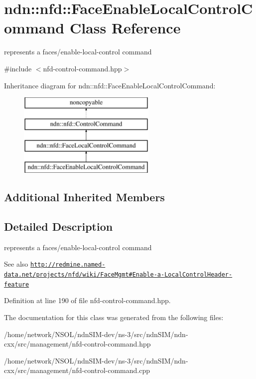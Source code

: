 \hypertarget{classndn_1_1nfd_1_1FaceEnableLocalControlCommand}{}\section{ndn\+:\+:nfd\+:\+:Face\+Enable\+Local\+Control\+Command Class Reference}
\label{classndn_1_1nfd_1_1FaceEnableLocalControlCommand}


represents a faces/enable-\/local-\/control command  




{\ttfamily \#include $<$nfd-\/control-\/command.\+hpp$>$}

Inheritance diagram for ndn\+:\+:nfd\+:\+:Face\+Enable\+Local\+Control\+Command\+:\begin{figure}[H]
\begin{center}
\leavevmode
\includegraphics[height=4.000000cm]{classndn_1_1nfd_1_1FaceEnableLocalControlCommand}
\end{center}
\end{figure}
\subsection*{Additional Inherited Members}


\subsection{Detailed Description}
represents a faces/enable-\/local-\/control command 

\begin{DoxySeeAlso}{See also}
\href{http://redmine.named-data.net/projects/nfd/wiki/FaceMgmt#Enable-a-LocalControlHeader-feature}{\tt http\+://redmine.\+named-\/data.\+net/projects/nfd/wiki/\+Face\+Mgmt\#\+Enable-\/a-\/\+Local\+Control\+Header-\/feature} 
\end{DoxySeeAlso}


Definition at line 190 of file nfd-\/control-\/command.\+hpp.



The documentation for this class was generated from the following files\+:\begin{DoxyCompactItemize}
\item 
/home/network/\+N\+S\+O\+L/ndn\+S\+I\+M-\/dev/ns-\/3/src/ndn\+S\+I\+M/ndn-\/cxx/src/management/nfd-\/control-\/command.\+hpp\item 
/home/network/\+N\+S\+O\+L/ndn\+S\+I\+M-\/dev/ns-\/3/src/ndn\+S\+I\+M/ndn-\/cxx/src/management/nfd-\/control-\/command.\+cpp\end{DoxyCompactItemize}
